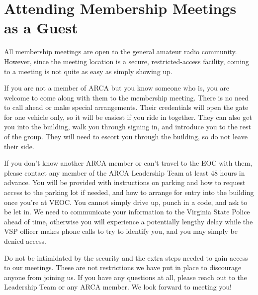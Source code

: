 \documentclass[pdflatex,letterpaper,twoside,12pt]{book}
\begin{document}

\section{Attending Membership Meetings as a Guest}

All membership meetings are open to the general amateur radio community.  However, since the meeting location is a secure, restricted-access facility, coming to a meeting is not quite as easy as simply showing up.

If you are not a member of ARCA but you know someone who is, you are welcome to come along with them to the membership meeting.  There is no need to call ahead or make special arrangements.  Their credentials will open the gate for one vehicle only, so it will be easiest if you ride in together.  They can also get you into the building, walk you through signing in, and introduce you to the rest of the group.  They will need to escort you through the building, so do not leave their side.

If you don't know another ARCA member or can't travel to the EOC with them, please contact any member of the ARCA Leadership Team at least 48 hours in advance.  You will be provided with instructions on parking and how to request access to the parking lot if needed, and how to arrange for entry into the building once you're at VEOC.  You cannot simply drive up, punch in a code, and ask to be let in.  We need to communicate your information to the Virginia State Police ahead of time, otherwise you will experience a potentially lengthy delay while the VSP officer makes phone calls to try to identify you, and you may simply be denied access.

Do not be intimidated by the security and the extra steps needed to gain access to our meetings.  These are not restrictions we have put in place to discourage anyone from joining us.  If you have any questions at all, please reach out to the Leadership Team or any ARCA member.  We look forward to meeting you!


\end{document}
